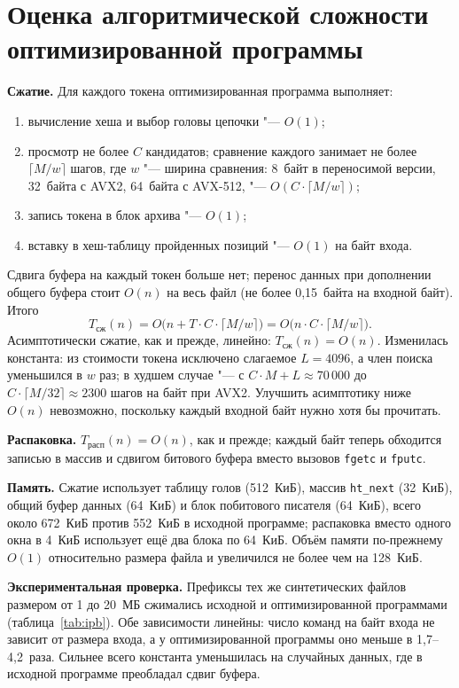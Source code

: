 \section{Оценка алгоритмической сложности оптимизированной программы}

\textbf{Сжатие.} Для каждого токена оптимизированная программа выполняет:
\begin{enumerate}
\item вычисление хеша и выбор головы цепочки "--- $O(1)$;
\item просмотр не более $C$ кандидатов; сравнение каждого занимает не более
$\lceil M/w \rceil$ шагов, где $w$ "--- ширина сравнения: 8~байт в
переносимой версии, 32~байта с AVX2, 64~байта с AVX-512, "--- $O(C \cdot
\lceil M/w \rceil)$;
\item запись токена в блок архива "--- $O(1)$;
\item вставку в хеш-таблицу пройденных позиций "--- $O(1)$ на байт входа.
\end{enumerate}
Сдвига буфера на каждый токен больше нет; перенос данных при дополнении
общего буфера стоит $O(n)$ на весь файл (не более 0,15~байта на входной
байт). Итого
\begin{equation}
\label{eq:final}
T_{\text{сж}}(n) = O\bigl(n + T \cdot C \cdot \lceil M/w \rceil\bigr) =
O\bigl(n \cdot C \cdot \lceil M/w \rceil\bigr).
\end{equation}
Асимптотически сжатие, как и прежде, линейно: $T_{\text{сж}}(n) = O(n)$.
Изменилась константа: из стоимости токена исключено слагаемое $L = 4096$, а
член поиска уменьшился в $w$ раз; в худшем случае "--- с $C \cdot M + L
\approx 70\,000$ до $C \cdot \lceil M/32 \rceil \approx 2300$ шагов на байт
при AVX2. Улучшить асимптотику ниже $O(n)$ невозможно, поскольку каждый
входной байт нужно хотя бы прочитать.

\textbf{Распаковка.} $T_{\text{расп}}(n) = O(n)$, как и прежде; каждый байт
теперь обходится записью в массив и сдвигом битового буфера вместо вызовов
\texttt{fgetc} и \texttt{fputc}.

\textbf{Память.} Сжатие использует таблицу голов (512~КиБ), массив
\texttt{ht\_next} (32~КиБ), общий буфер данных (64~КиБ) и блок
побитового писателя (64~КиБ), всего около 672~КиБ против 552~КиБ в
исходной программе; распаковка вместо одного окна в 4~КиБ использует ещё
два блока по 64~КиБ. Объём памяти по-прежнему $O(1)$ относительно размера
файла и увеличился не более чем на 128~КиБ.

\textbf{Экспериментальная проверка.} Префиксы тех же синтетических файлов
размером от 1 до 20~МБ сжимались исходной и оптимизированной
программами (таблица~\ref{tab:ipb}). Обе
зависимости линейны: число команд на байт входа не зависит от размера
входа, а у оптимизированной программы оно меньше в 1,7--4,2~раза. Сильнее
всего константа уменьшилась на случайных данных, где в исходной программе
преобладал сдвиг буфера.

